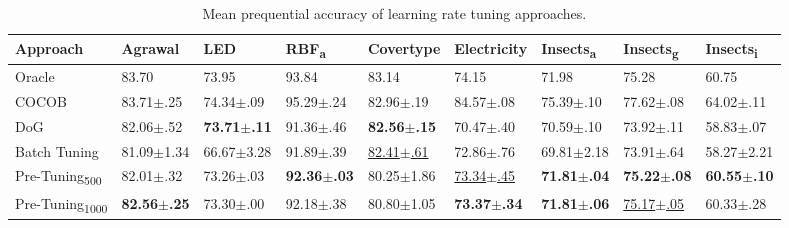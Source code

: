 \documentclass{article} %
\begin{document}
\begin{table}[ht]
   \centering
   \small
   \caption{
      Mean prequential accuracy of learning rate tuning approaches.
   }\label{tab:lr_tuning}
   \begin{tabular}{lllllllll}
      \toprule
      Approach                       & Agrawal                 & LED                     & RBF\textsubscript{a}    & Covertype                 & Electricity               & Insects\textsubscript{a} & Insects\textsubscript{g}  & Insects\textsubscript{i} \\
      \midrule
      Oracle                         & 83.70                   & 73.95                   & 93.84                   & 83.14                     & 74.15                     & 71.98                    & 75.28                     & 60.75                    \\
      COCOB                          & 83.71$\pm$.25           & 74.34$\pm$.09           & 95.29$\pm$.24           & 82.96$\pm$.19             & 84.57$\pm$.08             & 75.39$\pm$.10            & 77.62$\pm$.08             & 64.02$\pm$.11            \\ \midrule
      DoG                            & 82.06$\pm$.52           & \bfseries 73.71$\pm$.11 & 91.36$\pm$.46           & \bfseries 82.56$\pm$.15   & 70.47$\pm$.40             & 70.59$\pm$.10            & 73.92$\pm$.11             & 58.83$\pm$.07            \\
      Batch Tuning                   & 81.09$\pm$1.34          & 66.67$\pm$3.28          & 91.89$\pm$.39           & \underline{82.41$\pm$.61} & 72.86$\pm$.76             & 69.81$\pm$2.18           & 73.91$\pm$.64             & 58.27$\pm$2.21           \\
      Pre-Tuning\textsubscript{500}  & 82.01$\pm$.32           & 73.26$\pm$.03           & \bfseries 92.36$\pm$.03 & 80.25$\pm$1.86            & \underline{73.34$\pm$.45} & \bfseries 71.81$\pm$.04  & \bfseries 75.22$\pm$.08   & \bfseries 60.55$\pm$.10  \\
      Pre-Tuning\textsubscript{1000} & \bfseries 82.56$\pm$.25 & 73.30$\pm$.00           & 92.18$\pm$.38           & 80.80$\pm$1.05            & \bfseries 73.37$\pm$.34   & \bfseries 71.81$\pm$.06  & \underline{75.17$\pm$.05} & 60.33$\pm$.28            \\
      \bottomrule
   \end{tabular}
\end{table}
\end{document}

